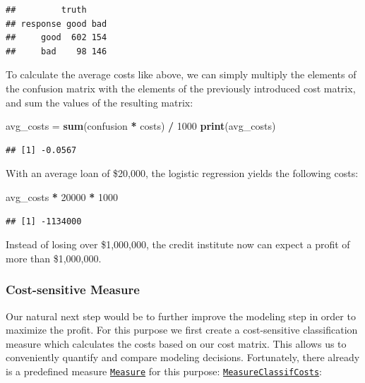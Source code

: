 \documentclass[]{article}
\newenvironment{Shaded}{\begin{snugshade}}{\end{snugshade}}
\newcommand{\DecValTok}[1]{\textcolor[rgb]{0.00,0.00,0.81}{#1}}
\newcommand{\KeywordTok}[1]{\textcolor[rgb]{0.13,0.29,0.53}{\textbf{#1}}}
\newcommand{\NormalTok}[1]{#1}
\newcommand{\OperatorTok}[1]{\textcolor[rgb]{0.81,0.36,0.00}{\textbf{#1}}}
\newcommand{\StringTok}[1]{\textcolor[rgb]{0.31,0.60,0.02}{#1}}
\renewenvironment{Shaded} {\begin{snugshade}\small} {\end{snugshade}}
\begin{document}
\begin{verbatim}
##         truth
## response good bad
##     good  602 154
##     bad    98 146
\end{verbatim}

To calculate the average costs like above, we can simply multiply the elements of the confusion matrix with the elements of the previously introduced cost matrix, and sum the values of the resulting matrix:

\begin{Shaded}
\begin{Highlighting}[]
\NormalTok{avg_costs =}\StringTok{ }\KeywordTok{sum}\NormalTok{(confusion }\OperatorTok{*}\StringTok{ }\NormalTok{costs) }\OperatorTok{/}\StringTok{ }\DecValTok{1000}
\KeywordTok{print}\NormalTok{(avg_costs)}
\end{Highlighting}
\end{Shaded}

\begin{verbatim}
## [1] -0.0567
\end{verbatim}

With an average loan of \$20,000, the logistic regression yields the following costs:

\begin{Shaded}
\begin{Highlighting}[]
\NormalTok{avg_costs }\OperatorTok{*}\StringTok{ }\DecValTok{20000} \OperatorTok{*}\StringTok{ }\DecValTok{1000}
\end{Highlighting}
\end{Shaded}

\begin{verbatim}
## [1] -1134000
\end{verbatim}

Instead of losing over \$1,000,000, the credit institute now can expect a profit of more than \$1,000,000.

\hypertarget{cost-sensitive-measure}{%
\subsubsection{Cost-sensitive Measure}\label{cost-sensitive-measure}}

Our natural next step would be to further improve the modeling step in order to maximize the profit.
For this purpose we first create a cost-sensitive classification measure which calculates the costs based on our cost matrix.
This allows us to conveniently quantify and compare modeling decisions.
Fortunately, there already is a predefined measure \href{https://mlr3.mlr-org.com/reference/Measure.html}{\texttt{Measure}} for this purpose: \href{https://mlr3.mlr-org.com/reference/mlr_measures_classif.costs.html}{\texttt{MeasureClassifCosts}}:
\end{document}
